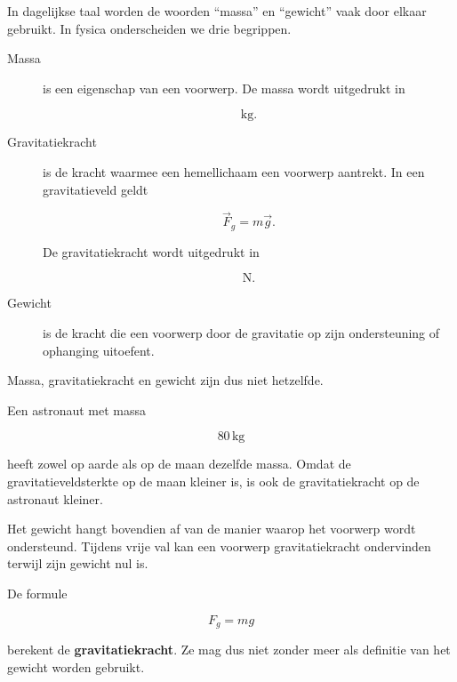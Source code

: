 \documentclass{ximera}
\begin{document}


In dagelijkse taal worden de woorden ``massa'' en ``gewicht'' vaak
door elkaar gebruikt. In fysica onderscheiden we drie begrippen.

\begin{description}

\item[Massa] is een eigenschap van een voorwerp. De massa wordt
uitgedrukt in

\[
\mathrm{kg}.
\]

\item[Gravitatiekracht] is de kracht waarmee een hemellichaam een
voorwerp aantrekt. In een gravitatieveld geldt

\[
\boxed{
\vec F_g=m\vec g.
}
\]

De gravitatiekracht wordt uitgedrukt in

\[
\mathrm N.
\]

\item[Gewicht] is de kracht die een voorwerp door de gravitatie op zijn
ondersteuning of ophanging uitoefent.

\end{description}

Massa, gravitatiekracht en gewicht zijn dus niet hetzelfde.

Een astronaut met massa

\[
80\,\mathrm{kg}
\]

heeft zowel op aarde als op de maan dezelfde massa. Omdat de
gravitatieveldsterkte op de maan kleiner is, is ook de gravitatiekracht
op de astronaut kleiner.

Het gewicht hangt bovendien af van de manier waarop het voorwerp wordt
ondersteund. Tijdens vrije val kan een voorwerp gravitatiekracht
ondervinden terwijl zijn gewicht nul is.

\begin{opmerking}

De formule

\[
F_g=mg
\]

berekent de \textbf{gravitatiekracht}. Ze mag dus niet zonder meer als
definitie van het gewicht worden gebruikt.

\end{opmerking}
\end{document}
